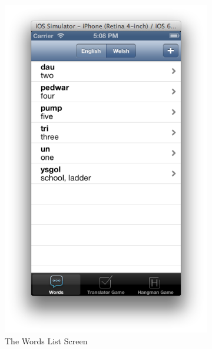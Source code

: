 \documentclass[11pt, a4paper]{article}
\begin{document}
\begin{figure}[h]
\centering
\begin{subfigure}[b]{0.3\textwidth}
\includegraphics[width=\textwidth]{img/words-list}
\caption{The Words List Screen}
\end{subfigure}
\begin{subfigure}[b]{0.3\textwidth}

\end{subfigure}
\end{figure}
\end{document}
